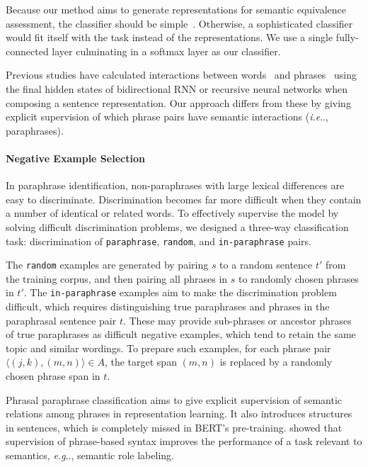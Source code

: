 \documentclass[11pt,a4paper]{article}
\makeatletter
\DeclareRobustCommand\onedot{\futurelet\@let@token\@onedot}
\def\@onedot{\ifx\@let@token.\else.\null\fi\xspace}
\def\eg{\emph{e.g}\onedot} \def\Eg{\emph{E.g}\onedot}
\def\ie{\emph{i.e}\onedot} \def\Ie{\emph{I.e}\onedot}
\makeatother
\begin{document}
Because our method aims to generate representations for semantic equivalence assessment,  the classifier should be simple~\cite{logeswaran2018an}. 
Otherwise, a sophisticated classifier would fit itself with the task instead of the representations. 
We use a single fully-connected layer culminating in a softmax layer as our classifier.  


Previous studies have calculated interactions between words~\cite{N16-1108} and phrases~\cite{P17-1152} using the final hidden states of bidirectional RNN or recursive neural networks when composing a sentence representation. 
Our approach differs from these by giving explicit supervision of which phrase pairs have semantic interactions (\ie, paraphrases). 

\paragraph{Negative Example Selection}
In paraphrase identification, non-paraphrases with large lexical differences are easy to discriminate. 
Discrimination becomes far more difficult when they contain a number of identical or related words. 
To effectively supervise the model by solving difficult discrimination problems, we designed a three-way classification task: discrimination of {\tt paraphrase},  {\tt random}, and {\tt in-paraphrase} pairs. 


The {\tt random} examples are generated by pairing $s$ to a random sentence $t'$ from the training corpus, and then pairing all phrases in $s$ to randomly chosen phrases in $t'$. 
The {\tt in-paraphrase} examples aim to make the discrimination problem difficult, which requires distinguishing true paraphrases and phrases in the paraphrasal sentence pair $t$. 
These may provide sub-phrases or ancestor phrases of true paraphrases as difficult negative examples, which tend to retain the same topic and similar wordings. 
To prepare such examples, for each phrase pair $\langle (j, k),  (m, n) \rangle \in A$, the target span $(m, n)$ is replaced by a randomly chosen phrase span in $t$. 


Phrasal paraphrase classification aims to give explicit supervision of semantic relations among phrases in representation learning. 
It also introduces structures in sentences, which is completely missed in BERT's pre-training. 
 showed that supervision of phrase-based syntax improves the performance of a task relevant to semantics, \eg, semantic role labeling. 
\end{document}
